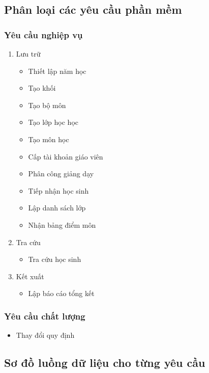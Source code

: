 \documentclass[a4paper]{article}
\begin{document}
	\subsection{Phân loại các yêu cầu phần mềm}
		\subsubsection{Yêu cầu nghiệp vụ}
		\begin{enumerate}[label=\alph*.]
    \item Lưu trữ
    	\begin{itemize}
        \item Thiết lập năm học
        \item Tạo khối
        \item Tạo bộ môn
         \item Tạo lớp học học
          \item Tạo môn học
          \item Cấp tài khoản giáo viên
          \item Phân công giảng dạy
          \item Tiếp nhận học sinh
          \item Lập danh sách lớp
          \item Nhận bảng điểm môn
          
    		\end{itemize}
    \item Tra cứu
    		\begin{itemize}
    			\item Tra cứu học sinh
    		\end{itemize}
    \item Kết xuất
			
			\begin{itemize}
			\item Lập báo cáo tổng kết
			\end{itemize}			    		
    		
		\end{enumerate}
		
		\subsubsection{Yêu cầu chất lượng}
		\begin{itemize}
		\item Thay đổi quy định
		\end{itemize}
		
	\subsection{Sơ đồ luồng dữ liệu cho từng yêu cầu}
\end{document}
